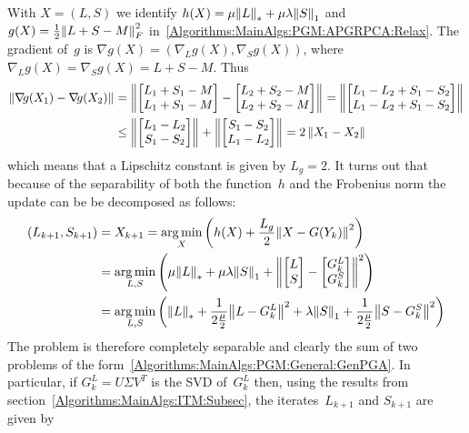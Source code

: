 With $X=(L,S)$ we identify $h(X) = \mu {\left\|L\right\|}_{*}^{} + \mu \lambda {\left\|S\right\|}_{1}^{}$ and $g(X) = \frac{1}{2} {\left\|L+S-M\right\|}_{F}^{2}$ in~\eqref{Algorithms:MainAlgs:PGM:APGRPCA:Relax}. The gradient of~$g$ is $\nabla g(X) = (\nabla_{\!L} g(X),\nabla_{\!S} g(X))$, where $\nabla_{\!L} g(X) = \nabla_{\!S} g(X) = L+S-M$. Thus
\begin{align*}
{\left\|\operatorname{\nabla\!\!}g(X_1) -\operatorname{\nabla\!\!}g(X_2)\right\|}_{}^{} &= {\left\|\begin{bmatrix} L_1+S_1-M \\ L_1+S_1-M  \end{bmatrix} - \begin{bmatrix} L_2+S_2-M \\ L_2+S_2-M  \end{bmatrix}\right\|}_{}^{} = {\left\|\begin{bmatrix} L_1-L_2 + S_1-S_2 \\ L_1-L_2 + S_1-S_2  \end{bmatrix}\right\|}_{}^{} \\
&\leq {\left\|\begin{bmatrix} L_1-L_2\\ S_1-S_2  \end{bmatrix}\right\|}_{}^{} + {\left\|\begin{bmatrix} S_1-S_2\\ L_1-L_2  \end{bmatrix}\right\|}_{}^{} = 2\, {\left\|X_1-X_2\right\|}_{}^{}
\end{align*}
which means that a Lipschitz constant is given by $L_g =2$. It turns out that because of the separability of both the function~$h$ and the Frobenius norm the update can be be decomposed as follows:
%
\begin{align*}
(L_{k+1},S_{k+1}) &= X_{k+1} = \operatorname*{arg\,min}_X \left( h(X) +\frac{L_g}{2} {\left\|X-G(Y_k)\right\|}_{}^{2} \right)  \\
&= \operatorname*{arg\,min}_{L,S} \left( \mu {\left\|L\right\|}_{*}^{} + \mu \lambda {\left\|S\right\|}_{1}^{} + {\left\|\begin{bmatrix}L \\ S\end{bmatrix} - \begin{bmatrix}G_k^L \\ G_k^S\end{bmatrix} \right\|}_{}^{2} \right) \\
&= \operatorname*{arg\,min}_{L,S} \left( {\left\|L\right\|}_{*}^{} + \frac{1}{2\frac{\mu}{2}} {\left\|L - G_k^L\right\|}_{}^{2}  + \lambda {\left\|S\right\|}_{1}^{}  + \frac{1}{2\frac{\mu}{2}}  {\left\|S - G_k^S\right\|}_{}^{2} \right)
\end{align*}
The problem is therefore completely separable and clearly the sum of two problems of the form~\eqref{Algorithms:MainAlgs:PGM:General:GenPGA}. In particular, if $G_k^L = U \Sigma V^T$ is the SVD of~$G_k^L$ then, using the results from section~\ref{Algorithms:MainAlgs:ITM:Subsec}, the iterates~$L_{k+1}$ and $S_{k+1}$ are given by 
